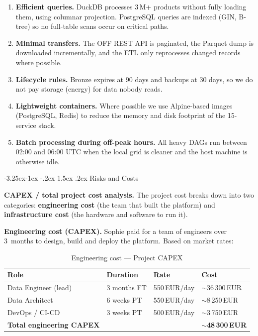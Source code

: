 \documentclass[a4paper,11pt,oneside,openany]{report}
\makeatletter
\renewcommand\subsubsection{\@startsection{subsubsection}{3}{\z@}%
  {-3.25ex\@plus -1ex \@minus -.2ex}%
  {1.5ex \@plus .2ex}%
  {\normalfont\normalsize\bfseries\color{ntblue}}}
\makeatother
\begin{document}
\begin{enumerate}[nosep]
  \item \textbf{Efficient queries.} DuckDB processes 3\,M+
        products without fully loading them, using columnar
        projection. PostgreSQL queries are indexed (GIN, B-tree)
        so no full-table scans occur on critical paths.
  \item \textbf{Minimal transfers.} The OFF REST API is paginated,
        the Parquet dump is downloaded incrementally, and the ETL
        only reprocesses changed records where possible.
  \item \textbf{Lifecycle rules.} Bronze expires at 90 days and
        backups at 30 days, so we do not pay storage (energy) for
        data nobody reads.
  \item \textbf{Lightweight containers.} Where possible we use
        Alpine-based images (PostgreSQL, Redis) to reduce the
        memory and disk footprint of the 15-service stack.
  \item \textbf{Batch processing during off-peak hours.} All
        heavy DAGs run between 02:00 and 06:00 UTC when the local
        grid is cleaner and the host machine is otherwise idle.
\end{enumerate}

\subsubsection{Risks and Costs}
\label{sec:capex}

\textbf{CAPEX / total project cost analysis.} The project cost
breaks down into two categories: \textbf{engineering cost} (the
team that built the platform) and \textbf{infrastructure cost}
(the hardware and software to run it).

\textbf{Engineering cost (CAPEX).} Sophie paid for a team of
engineers over 3~months to design, build and deploy the platform.
Based on market rates:

\begin{table}[H]
\centering
\caption{Engineering cost --- Project CAPEX}
\begin{tabularx}{\textwidth}{L{5cm} C{2cm} C{2cm} C{3cm}}
\toprule
\textbf{Role} & \textbf{Duration} & \textbf{Rate} & \textbf{Cost} \\
\midrule
Data Engineer (lead) & 3 months FT & 550\,EUR/day & $\sim$36\,300\,EUR \\
Data Architect & 6 weeks PT & 550\,EUR/day & $\sim$8\,250\,EUR \\
DevOps / CI-CD & 3 weeks PT & 500\,EUR/day & $\sim$3\,750\,EUR \\
\midrule
\textbf{Total engineering CAPEX} & & & \textbf{$\sim$48\,300\,EUR} \\
\bottomrule
\end{tabularx}
\end{table}
\end{document}
